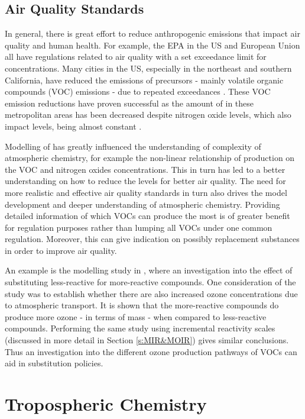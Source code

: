 \subsection{Air Quality Standards}

In general, there is great effort to reduce anthropogenic emissions that impact air quality and human health. For example, the 
EPA in the US and European Union all have regulations related to air quality with a set exceedance limit for  
concentrations. Many cities in the US, especially in the northeast and southern California, have reduced the emissions of 
 precursors - mainly volatile organic compounds (VOC) emissions - due to repeated exceedances \citep{Fiore:1998}. These 
VOC emission reductions have proven successful as the amount of  in these metropolitan areas has been decreased despite 
nitrogen oxide levels, which also impact  levels, being almost constant \citep{Fiore:1998, Lin:2001}.

Modelling of  has greatly influenced the understanding of complexity of atmospheric chemistry, for example the 
non-linear relationship of  production on the VOC and nitrogen oxides concentrations. This in turn has led to a better 
understanding on how to reduce the  levels for better air quality. The need for more realistic and effective air quality
standards in turn also drives the model development and deeper understanding of atmospheric chemistry. Providing detailed 
information of which VOCs can produce the most  is of greater benefit for regulation purposes rather than lumping all 
VOCs under one common regulation. Moreover, this can give indication on possibly replacement substances in order to improve air
quality.

An example is the modelling study in \citep{Capps:2010}, where an investigation into the effect of substituting less-reactive 
for more-reactive compounds. One consideration of the study was to establish whether there are also increased ozone 
concentrations due to atmospheric transport. It is shown that the more-reactive compounds do produce more ozone - in terms of 
mass - when compared to less-reactive compounds. Performing the same study using incremental reactivity scales (discussed in 
more detail in Section \ref{s:MIR&MOIR}) gives similar conclusions. Thus an investigation into the different ozone production 
pathways of VOCs can aid in substitution policies.

\section{Tropospheric Chemistry} \label{s:atmo_chem}

